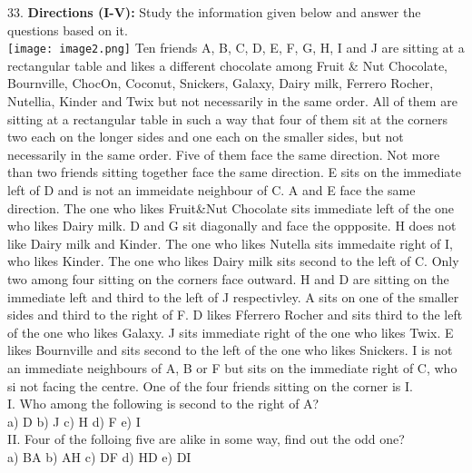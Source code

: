 \documentclass[
]{article}
\begin{document}
33. \textbf{Directions (I-V):} Study the information given below and answer the questions based on it.\\
\texttt{[image: image2.png]}
Ten friends A, B, C, D, E, F, G, H, I and J are sitting at a rectangular table and likes a
different chocolate among Fruit \& Nut Chocolate, Bournville, ChocOn, Coconut, Snickers,
Galaxy, Dairy milk, Ferrero Rocher, Nutellia, Kinder and Twix but not necessarily in the
same order. All of them are sitting at a rectangular table in such a way that four of them sit
at the corners two each on the longer sides and one each on the smaller sides, but not
necessarily in the same order. Five of them face the same direction. Not more than two
friends sitting together face the same direction. E sits on the immediate left of D and is not
an immeidate neighbour of C. A and E face the same direction. The one who likes Fruit\&Nut Chocolate sits immediate left of the one who likes Dairy milk. D and G sit diagonally
and face the oppposite. H does not like Dairy milk and Kinder. The one who likes Nutella
sits immedaite right of I, who likes Kinder. The one who likes Dairy milk sits second to the
left of C. Only two among four sitting on the corners face outward. H and D are sitting on
the immediate left and third to the left of J respectivley. A sits on one of the smaller sides
and third to the right of F. D likes Fferrero Rocher and sits third to the left of the one who
likes Galaxy. J sits immediate right of the one who likes Twix. E likes Bournville and sits
second to the left of the one who likes Snickers. I is not an immediate neighbours of A, B or
F but sits on the immediate right of C, who si not facing the centre. One of the four friends
sitting on the corner is I.\\

I. Who among the following is second to the right of A?\\
a) D \hspace{2mm}b) J \hspace{2mm}c) H \hspace{2mm}d) F \hspace{2mm}e) I\\

II. Four of the folloing five are alike in some way, find out the odd one?\\
a) BA \hspace{2mm}b) AH \hspace{2mm}c) DF \hspace{2mm}d) HD \hspace{2mm}e) DI\\
\end{document}
